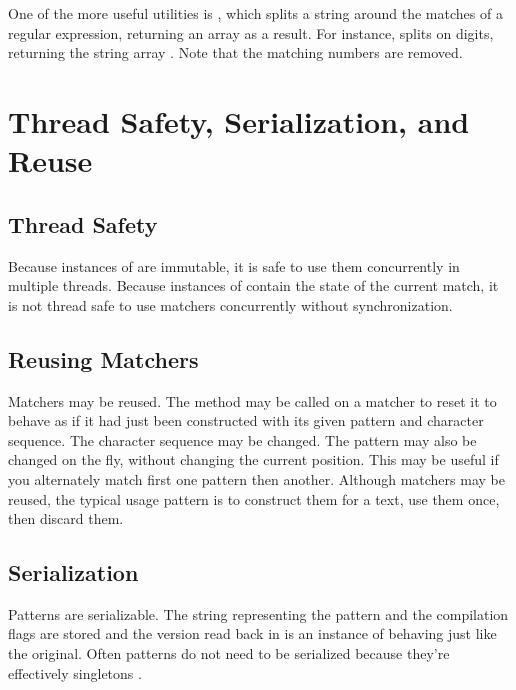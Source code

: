 One of the more useful utilities is
, which splits a string around the matches of
a regular expression, returning an array as a result.  For instance,
 splits on digits, returning
the string array .  Note that the
matching numbers are removed.

\section{Thread Safety, Serialization, and Reuse}

\subsection{Thread Safety}

Because instances of  are immutable, it is safe to use
them concurrently in multiple threads.  Because instances of
 contain the state of the current match, it is not
thread safe to use matchers concurrently without synchronization.

\subsection{Reusing Matchers}

Matchers may be reused.  The method  may be called on a
matcher to reset it to behave as if it had just been constructed with
its given pattern and character sequence.  The character sequence may
be changed.  The pattern may also be changed on the fly, without
changing the current position.  This may be useful if you alternately
match first one pattern then another.  Although matchers may be
reused, the typical usage pattern is to construct them for a text, use
them once, then discard them.


\subsection{Serialization}

Patterns are serializable.  The string representing the pattern and
the compilation flags are stored and the version read back in is an
instance of  behaving just like the original.  Often
patterns do not need to be serialized because they're effectively
singletons .
